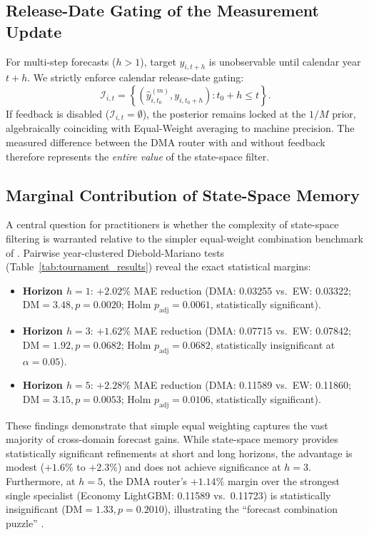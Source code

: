 \documentclass[11pt,a4paper]{article}
\begin{document}
\subsection{Release-Date Gating of the Measurement Update}

For multi-step forecasts ($h > 1$), target $y_{i,t+h}$ is unobservable until calendar year $t+h$. We strictly enforce calendar release-date gating:
\begin{equation}
\mathcal{I}_{i,t} = \left\{ \left(\hat{y}^{(m)}_{i,t_0}, y_{i,t_0+h}\right) : t_0 + h \le t \right\}.
\end{equation}
If feedback is disabled ($\mathcal{I}_{i,t} = \emptyset$), the posterior remains locked at the $1/M$ prior, algebraically coinciding with Equal-Weight averaging to machine precision. The measured difference between the DMA router with and without feedback therefore represents the \emph{entire value} of the state-space filter.

\subsection{Marginal Contribution of State-Space Memory}
\label{sec:dms_margin}

A central question for practitioners is whether the complexity of state-space filtering is warranted relative to the simpler equal-weight combination benchmark of \citet{bates1969}. Pairwise year-clustered Diebold-Mariano tests (Table~\ref{tab:tournament_results}) reveal the exact statistical margins:
\begin{itemize}[leftmargin=*]
    \item \textbf{Horizon $h=1$}: $+2.02\%$ MAE reduction (DMA: 0.03255 vs.\ EW: 0.03322; $\text{DM} = 3.48, p = 0.0020$; Holm $p_{\text{adj}} = 0.0061$, statistically significant).
    \item \textbf{Horizon $h=3$}: $+1.62\%$ MAE reduction (DMA: 0.07715 vs.\ EW: 0.07842; $\text{DM} = 1.92, p = 0.0682$; Holm $p_{\text{adj}} = 0.0682$, statistically insignificant at $\alpha = 0.05$).
    \item \textbf{Horizon $h=5$}: $+2.28\%$ MAE reduction (DMA: 0.11589 vs.\ EW: 0.11860; $\text{DM} = 3.15, p = 0.0053$; Holm $p_{\text{adj}} = 0.0106$, statistically significant).
\end{itemize}
These findings demonstrate that simple equal weighting captures the vast majority of cross-domain forecast gains. While state-space memory provides statistically significant refinements at short and long horizons, the advantage is modest ($+1.6\%$ to $+2.3\%$) and does not achieve significance at $h=3$. Furthermore, at $h=5$, the DMA router's $+1.14\%$ margin over the strongest single specialist (Economy LightGBM: 0.11589 vs.\ 0.11723) is statistically insignificant ($\text{DM} = 1.33, p = 0.2010$), illustrating the ``forecast combination puzzle'' \citep{smithwallis2009}.
\end{document}
